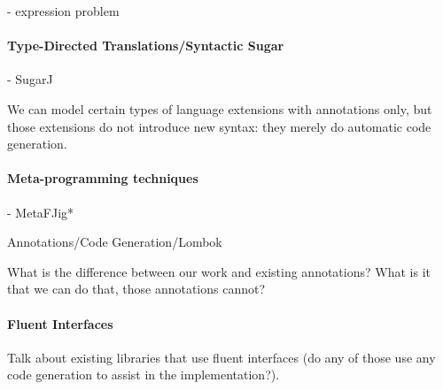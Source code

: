 - expression problem




\paragraph{Type-Directed Translations/Syntactic Sugar}

- SugarJ

We can model certain types of language extensions with annotations 
only, but those extensions do not introduce new syntax: they 
merely do automatic code generation. 

\paragraph{Meta-programming techniques}
- MetaFJig*

Annotations/Code Generation/Lombok

What is the difference between our work and existing annotations? 
What is it that we can do that, those annotations cannot?

\paragraph{Fluent Interfaces}

Talk about existing libraries that use fluent interfaces (do any of 
those use any code generation to assist in the implementation?). 


